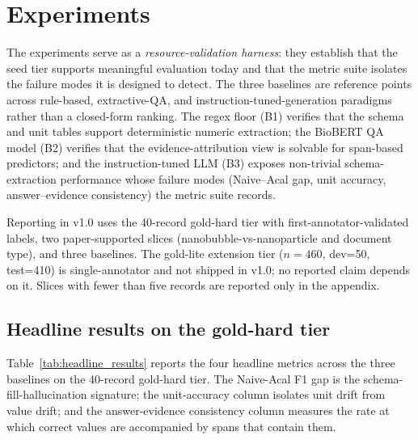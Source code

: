 \documentclass{article}
\begin{document}
\section{Experiments}
\label{sec:experiments}

The experiments serve as a \emph{resource-validation harness}: they establish that the seed tier supports meaningful evaluation today and that the metric suite isolates the failure modes it is designed to detect. The three baselines are reference points across rule-based, extractive-QA, and instruction-tuned-generation paradigms rather than a closed-form ranking. The regex floor (B1) verifies that the schema and unit tables support deterministic numeric extraction; the BioBERT QA model (B2) verifies that the evidence-attribution view is solvable for span-based predictors; and the instruction-tuned LLM (B3) exposes non-trivial schema-extraction performance whose failure modes (Naive--Acal gap, unit accuracy, answer--evidence consistency) the metric suite records.

Reporting in v1.0 uses the 40-record gold-hard tier with first-annotator-validated labels, two paper-supported slices (nanobubble-vs-nanoparticle and document type), and three baselines. The gold-lite extension tier ($n=460$, dev=50, test=410) is single-annotator and not shipped in v1.0; no reported claim depends on it. Slices with fewer than five records are reported only in the appendix.

\subsection{Headline results on the gold-hard tier}
\label{sec:headline}

Table~\ref{tab:headline_results} reports the four headline metrics
across the three baselines on the 40-record gold-hard tier. The
Naive-Acal F1 gap is the schema-fill-hallucination signature; the
unit-accuracy column isolates unit drift from value drift; and the
answer-evidence consistency column measures the rate at which
correct values are accompanied by spans that contain them.
\end{document}
